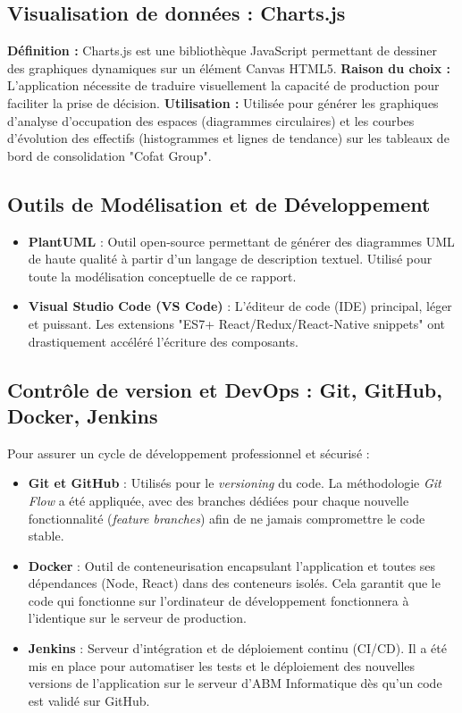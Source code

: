 \subsection{Visualisation de données : Charts.js}
\textbf{Définition :} Charts.js est une bibliothèque JavaScript permettant de dessiner des graphiques dynamiques sur un élément Canvas HTML5.
\newline
\textbf{Raison du choix :} L'application nécessite de traduire visuellement la capacité de production pour faciliter la prise de décision.
\newline
\textbf{Utilisation :} Utilisée pour générer les graphiques d'analyse d'occupation des espaces (diagrammes circulaires) et les courbes d'évolution des effectifs (histogrammes et lignes de tendance) sur les tableaux de bord de consolidation "Cofat Group".

\subsection{Outils de Modélisation et de Développement}
\begin{itemize}
    \item \textbf{PlantUML} : Outil open-source permettant de générer des diagrammes UML de haute qualité à partir d'un langage de description textuel. Utilisé pour toute la modélisation conceptuelle de ce rapport.
    \item \textbf{Visual Studio Code (VS Code)} : L'éditeur de code (IDE) principal, léger et puissant. Les extensions "ES7+ React/Redux/React-Native snippets" ont drastiquement accéléré l'écriture des composants.
\end{itemize}

\subsection{Contrôle de version et DevOps : Git, GitHub, Docker, Jenkins}
Pour assurer un cycle de développement professionnel et sécurisé :
\begin{itemize}
    \item \textbf{Git et GitHub} : Utilisés pour le \textit{versioning} du code. La méthodologie \textit{Git Flow} a été appliquée, avec des branches dédiées pour chaque nouvelle fonctionnalité (\textit{feature branches}) afin de ne jamais compromettre le code stable.
    \item \textbf{Docker} : Outil de conteneurisation encapsulant l'application et toutes ses dépendances (Node, React) dans des conteneurs isolés. Cela garantit que le code qui fonctionne sur l'ordinateur de développement fonctionnera à l'identique sur le serveur de production.
    \item \textbf{Jenkins} : Serveur d'intégration et de déploiement continu (CI/CD). Il a été mis en place pour automatiser les tests et le déploiement des nouvelles versions de l'application sur le serveur d'ABM Informatique dès qu'un code est validé sur GitHub.
\end{itemize}

